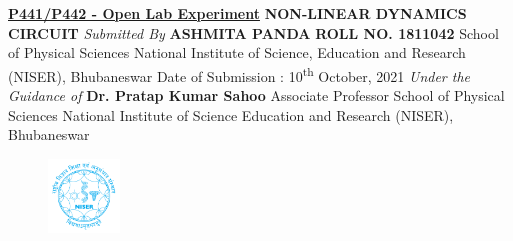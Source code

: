 \documentclass[12pt]{article}
\begin{document}
\doublespace
\begin{titlepage}
	\begin{center}
		\vspace*{0.2cm}
		\textbf{\uline{P441/P442 - Open Lab Experiment}} \linebreak
		\vspace{1.5cm}\linebreak
		\textbf{\Large{NON-LINEAR DYNAMICS CIRCUIT}}\linebreak
		\vspace{2cm} \linebreak
		\textit{Submitted By} \linebreak \textbf{ASHMITA PANDA} \linebreak 
		\textbf{ROLL NO. 1811042} \linebreak
		School of Physical Sciences \linebreak National Institute of Science, Education and Research (NISER), Bhubaneswar \linebreak
		Date of Submission : 10\textsuperscript{th} October, 2021
		\vspace{2.5cm} \linebreak
		\textit{Under the Guidance of} \linebreak \textbf{Dr. Pratap Kumar Sahoo} \linebreak Associate Professor \linebreak School of Physical Sciences \linebreak National Institute of Science Education and Research (NISER), Bhubaneswar
		\vspace{1cm} \linebreak

	\end{center}
	\begin{figure}[H]
		\centering
		\includegraphics[width=0.17\textwidth]{niser logo}
	\end{figure}
\end{titlepage}

\raggedright
\newpage
{}

\singlespacing
\tableofcontents
{}
\onehalfspacing
\end{document}

